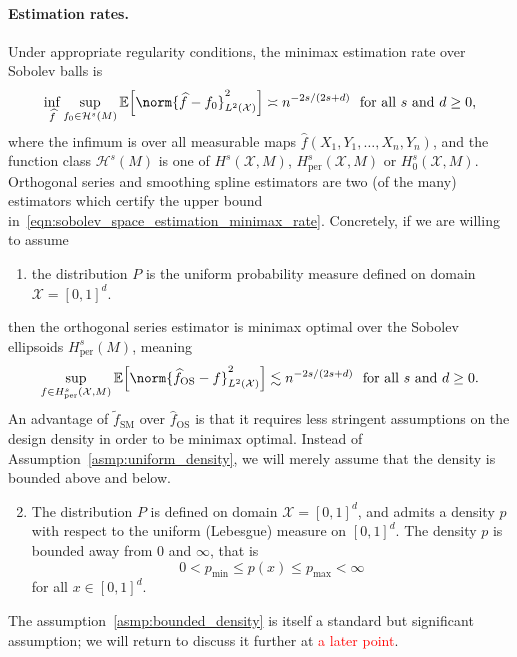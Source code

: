\documentclass{article}
\newcommand{\1}{\mathbf{1}}
\newcommand{\Xset}{\mathcal{X}}
\newcommand{\mc}[1]{\mathcal{#1}}
\newcommand{\Ebb}{\mathbb{E}}
\newcommand{\wt}[1]{\widetilde{#1}}
\newcommand{\wh}[1]{\widehat{#1}}
\newcommand{\SM}{\mathrm{SM}}
\newcommand{\OS}{\mathrm{OS}}
\theoremstyle{alden}
\theoremstyle{aldenthm}
\theoremstyle{definition}
\theoremstyle{remark}
\begin{document}
\paragraph{Estimation rates.}
Under appropriate regularity conditions, the minimax estimation rate over Sobolev balls is 
\begin{equation}
\label{eqn:sobolev_space_estimation_minimax_rate}
\inf_{\wh{f}} \sup_{f_0 \in \mc{H}^s(M)} \Ebb\Bigl[\norm{\wh{f} - f_0}_{L^2(\Xset)}^2\Bigr] \asymp n^{-2s/(2s + d)}~~\textrm{for all $s$ and $d \geq 0$,}
\end{equation}
where the infimum is over all measurable maps $\wh{f}(X_1,Y_1,\ldots,X_n,Y_n)$, and the function class $\mc{H}^s(M)$ is one of $H^s(\Xset,M)$, $H_{\mathrm{per}}^s(\Xset,M)$ or $H_0^s(\Xset,M)$. Orthogonal series and smoothing spline estimators are two (of the many) estimators which certify the upper bound in~\eqref{eqn:sobolev_space_estimation_minimax_rate}. Concretely, if we are willing to assume
\begin{enumerate}[label=(P\arabic*)]
	\item
	\label{asmp:uniform_density}
	the distribution $P$ is the uniform probability measure defined on domain $\Xset = [0,1]^d$.
\end{enumerate}
then the orthogonal series estimator is minimax optimal over the Sobolev ellipsoids $H_{\mathrm{per}}^s(M)$, meaning
\begin{equation*}
\sup_{f \in H_{\mathrm{per}}^s(\Xset,M)}\Ebb\Bigl[\norm{\wh{f}_{\OS} - f}_{L^2(\Xset)}^2\Bigr]  \lesssim n^{-2s/(2s + d)}~~\textrm{for all $s$ and $d \geq 0$.}
\end{equation*}
An advantage of $\wt{f}_{\SM}$ over $\wh{f}_{\OS}$ is that it requires less stringent assumptions on the design density in order to be minimax optimal. Instead of Assumption~\ref{asmp:uniform_density}, we will merely assume that the density is bounded above and below.
\begin{enumerate}[label=(P\arabic*)]
	\setcounter{enumi}{1}
	\item 
	\label{asmp:bounded_density}
	The distribution $P$ is defined on domain $\Xset = [0,1]^d$, and admits a density $p$ with respect to the uniform (Lebesgue) measure on $[0,1]^d$. The density $p$ is bounded away from $0$ and $\infty$, that is
	\begin{equation*}
	0 < p_{\min} \leq p(x) \leq p_{\max} < \infty
	\end{equation*}
	for all $x \in [0,1]^d$.
\end{enumerate}
The assumption~\ref{asmp:bounded_density} is itself a standard but significant assumption; we will return to discuss it further at \textcolor{red}{a later point}.
\end{document}
